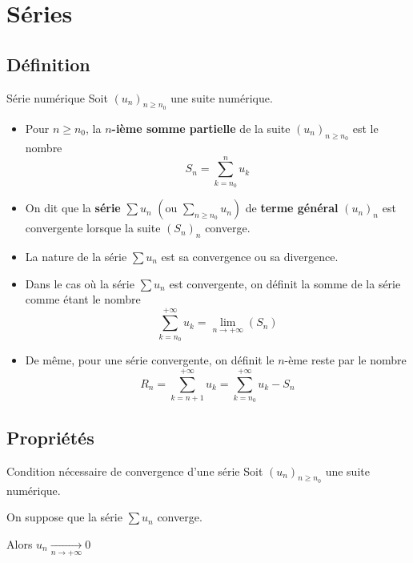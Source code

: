 
\section{Séries}

    \subsection{Définition}

    \begin{defi}{Série numérique}{}
        Soit $(u_n)_{n \geq n_0}$ une suite numérique.
        \begin{itemize}
            \item Pour $n \geq n_0$, la \textbf{$n$-ième somme partielle} de la suite $(u_n)_{n \geq n_0}$ est le nombre \[ S_n = \sum\limits_{k=n_0}^n u_k \]
            \item On dit que la \textbf{série} $\sum u_n$ $\left(\text{ou } \sum\limits_{n \geq n_0} u_n \right)$ de \textbf{terme général} $(u_n)_n$ est convergente lorsque la suite $(S_n)_n$ converge.
            \item La nature de la série $\sum u_n$ est sa convergence ou sa divergence.
            \item Dans le cas où la série $\sum u_n$ est convergente, on définit la somme de la série comme étant le nombre \[ \sum\limits_{k = n_0}^{+\infty} u_k = \lim\limits_{n \rightarrow +\infty} (S_n) \]
            \item De même, pour une série convergente, on définit le $n$-ème reste par le nombre 
            \[ R_n = \sum\limits_{k = n+1}^{+\infty} u_k = \sum\limits_{k = n_0}^{+\infty} u_k - S_n \]
        \end{itemize}
    \end{defi}

    \subsection{Propriétés}

    \begin{prop}{Condition nécessaire de convergence d’une série}{}
        Soit $(u_n)_{n \geq n_0}$ une suite numérique.

        On suppose que la série $\sum u_n$ converge.

        Alors $u_n \underset{n \rightarrow +\infty}{\longrightarrow} 0$
    \end{prop}


